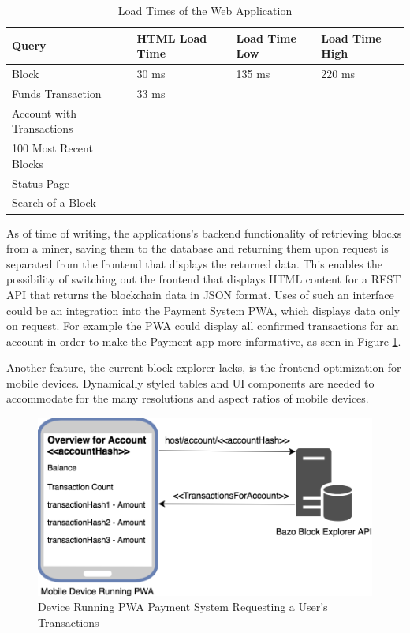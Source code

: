 \begin{table}[]
\centering
\caption{Load Times of the Web Application}
\label{tab:query}
\begin{tabular}{|l|l|l|l|}
\hline
\textbf{Query}            & \textbf{HTML Load Time} & \textbf{Load Time Low} & \textbf{Load Time High} \\ \hline
Block                     & 30 ms                   & 135 ms                 & 220 ms                  \\ \hline
Funds Transaction         & 33 ms                   &                        &                         \\ \hline
Account with Transactions &                         &                        &                         \\ \hline
100 Most Recent Blocks    &                         &                        &                         \\ \hline
Status Page               &                         &                        &                         \\ \hline
Search of a Block         &                         &                        &                         \\ \hline
\end{tabular}
\end{table}

As of time of writing, the applications's backend functionality of retrieving blocks from a miner, saving them to the database and returning them upon request is separated from the frontend that displays the returned data. This enables the possibility of switching out the frontend that displays HTML content for a REST API that returns the blockchain data in JSON format. Uses of such an interface could be an integration into the Payment System PWA, which displays data only on request. For example the PWA could display all confirmed transactions for an account in order to make the Payment app more informative, as seen in Figure \ref{fig:pwa_api}.

Another feature, the current block explorer lacks, is the frontend optimization for mobile devices. Dynamically styled tables and UI components are needed to accommodate for the many resolutions and aspect ratios of mobile devices.

\begin{figure}
  \includegraphics[scale=0.4]{pwa_integration.png}
  \centering
  \caption{Device Running PWA Payment System Requesting a User's Transactions}
  \label{fig:pwa_api}
\end{figure}